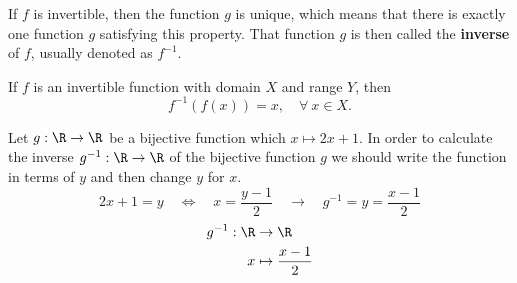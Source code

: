 If $f$ is invertible, then the function $g$ is unique, which means that there is exactly one function $g$ satisfying this property. That function $g$ is then called the \textbf{inverse} of $f$, usually denoted as $f^{-1}$.
\begin{proposition}
    If $f$ is an invertible function with domain $X$ and range $Y$, then
    \begin{equation}
        f^{-1}\left( f\left( x \right)  \right) = x,\quad \forall\ x\in X.
    \end{equation}
\end{proposition}
\begin{example}[.]
    Let $g:\R\to\R$ be a bijective function which $x\mapsto 2x + 1$. In order to calculate the inverse $g^{-1}:\R\to\R$ of the bijective function $g$ we should write the function in terms of $y$ and then change $y$ for $x$.
    \begin{equation}
        2x + 1 = y \quad\iff\quad x = \frac{y - 1}{2} \quad\rightarrow\quad g^{-1} = y = \frac{x - 1}{2}
    \end{equation}
    \begin{align}
        g^{-1}:\R&\to\R \\ x&\mapsto \frac{x - 1}{2}
    \end{align}
\end{example}

